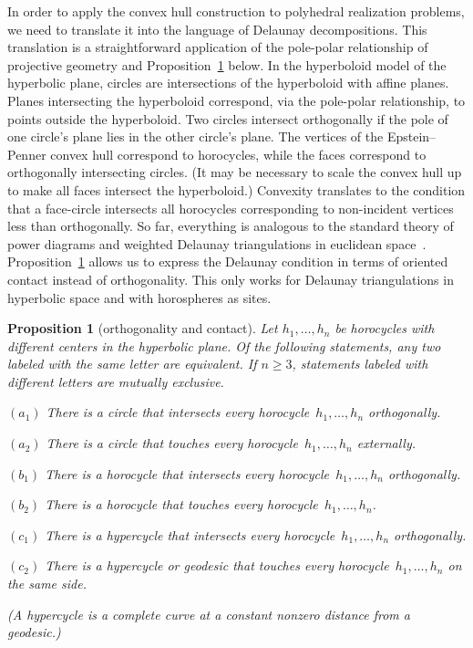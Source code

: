 \documentclass[a4paper, 11pt]{article}
\theoremstyle{plain}
\newtheorem{proposition}[theorem]{Proposition}
\theoremstyle{definition}
\begin{document}
In order to apply the convex hull construction to polyhedral
realization problems, we need to translate it into the language of
Delaunay decompositions. This translation is a straightforward
application of the pole-polar relationship of projective geometry and
Proposition~\ref{prop:orthotouch} below. In the hyperboloid model of
the hyperbolic plane, circles are intersections of the hyperboloid
with affine planes. Planes intersecting the hyperboloid correspond,
via the pole-polar relationship, to points outside the
hyperboloid. Two circles intersect orthogonally if the pole of one
circle's plane lies in the other circle's plane. The vertices of the
Epstein--Penner convex hull correspond to horocycles, while the faces
correspond to orthogonally intersecting circles. (It may be necessary
to scale the convex hull up to make all faces intersect the
hyperboloid.)  Convexity translates to the condition that a
face-circle intersects all horocycles corresponding to non-incident
vertices less than orthogonally. So far, everything is analogous to
the standard theory of power diagrams and weighted Delaunay
triangulations in euclidean space~\cite{aurenhammer13}.
Proposition~\ref{prop:orthotouch} allows us to express the Delaunay
condition in terms of oriented contact instead of orthogonality. This
only works for Delaunay triangulations in hyperbolic space and with
horospheres as sites.

\begin{proposition}[orthogonality and contact]
  \label{prop:orthotouch}
  Let $h_{1},\ldots,h_{n}$ be horocycles with different centers in the
  hyperbolic plane. Of the following statements, any two labeled with
  the same letter are equivalent. If $n\geq 3$, statements labeled
  with different letters are mutually exclusive.
  \begin{compactitem}[$(b_2)$]
    \medskip
  \item[$(a_1)$] There is a circle that intersects every horocycle~$h_{1},\ldots,h_{n}$ orthogonally.
  \item[$(a_2)$] There is a circle that touches every horocycle~$h_{1},\ldots,h_{n}$
    externally.
    \medskip
  \item[$(b_1)$] There is a horocycle that intersects every horocycle~$h_{1},\ldots,h_{n}$ orthogonally.
  \item[$(b_2)$] There is a horocycle that touches every
    horocycle~$h_{1},\ldots,h_{n}$.
    \medskip
  \item[$(c_1)$] There is a hypercycle that intersects every
    horocycle~$h_{1},\ldots,h_{n}$ orthogonally.
  \item[$(c_2)$] There is a hypercycle or geodesic that touches every
    horocycle~$h_{1},\ldots,h_{n}$ on the same side.
  \end{compactitem}
  (A hypercycle is a complete curve at a constant nonzero distance
  from a geodesic.)
\end{proposition}
\end{document}
